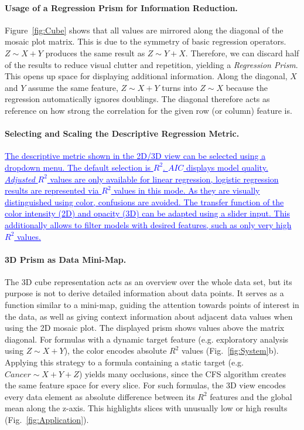 \documentclass[journal]{style/vgtc} 			          %
\newcommand{\add}[1]{\textcolor{blue}{\uline{#1}}}
\begin{document}
\paragraph{Usage of a Regression Prism for Information Reduction.}
Figure~\ref{fig:Cube} shows that all values are mirrored along the diagonal of the mosaic plot matrix.
This is due to the symmetry of basic regression operators.
$Z \sim X + Y$ produces the same result as $Z \sim Y + X$.
Therefore, we can discard half of the results to reduce visual clutter and repetition, yielding a \emph{Regression Prism}.
This opens up space for displaying additional information.
Along the diagonal, $X$ and $Y$ assume the same feature, $Z \sim X + Y$ turns into $Z \sim X$ because the regression automatically ignores doublings.
The diagonal therefore acts as reference on how strong the correlation for the given row (or column) feature is.

\paragraph{Selecting and Scaling the Descriptive Regression Metric.}
\add{
The descriptive metric shown in the 2D/3D view can be selected using a dropdown menu.
The default selection is $R^2$.
$AIC$ displays model quality.
\emph{Adjusted} $R^2$ values are only available for linear regression, logistic regression results are represented via $R^2$ values in this mode.
As they are visually distinguished using color, confusions are avoided.
The transfer function of the color intensity (2D) and opacity (3D) can be adapted using a slider input.
This additionally allows to filter models with desired features, such as only very high $R^2$ values.
}

\paragraph{3D Prism as Data Mini-Map.}
The 3D cube representation acts as an overview over the whole data set, but its purpose is not to derive detailed information about data points.
It serves as a function similar to a mini-map, guiding the attention towards points of interest in the data, as well as giving context information about adjacent data values when using the 2D mosaic plot.
The displayed prism shows values above the matrix diagonal.
For formulas with a dynamic target feature (e.g. exploratory analysis using $Z \sim X + Y$), the color encodes absolute $R^2$ values (Fig.~\ref{fig:System}b).
Applying this strategy to a formula containing a static target (e.g. $Cancer \sim X + Y + Z$) yields many occlusions, since the CFS algorithm creates the same feature space for every slice.
For such formulas, the 3D view encodes every data element as absolute difference between its $R^2$ features and the global mean along the z-axis.
This highlights slices with unusually low or high results (Fig.~\ref{fig:Application}).
\end{document}
